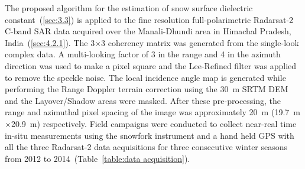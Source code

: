 The proposed algorithm for the estimation of snow surface dielectric constant~(\cref{sec:3.3}) is applied to the fine resolution full-polarimetric Radarsat-2 C-band SAR data acquired over the Manali-Dhundi area in Himachal Pradesh, India~(\cref{sec:4.2.1}). The 3$\times$3 coherency matrix was generated from the single-look complex data. A multi-looking factor of 3 in the range and 4 in the azimuth direction was used to make a pixel square and the Lee-Refined filter was applied to remove the speckle noise. The local incidence angle map is generated while performing the Range Doppler terrain correction using the 30~m SRTM DEM and the Layover/Shadow areas were masked. After these pre-processing, the range and azimuthal pixel spacing of the image was approximately 20~m (19.7~m$\times$20.9~m) respectively. Field campaigns were conducted to collect near-real time in-situ measurements using the snowfork instrument and a hand held GPS with all the three Radarsat-2 data acquisitions for three consecutive winter seasons from 2012 to 2014~(Table~\ref{table:data acquisition}).




